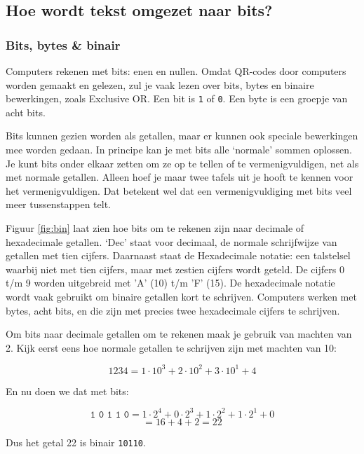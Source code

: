 \documentclass[a4paper]{article}
\begin{document}
\subsection{Hoe wordt tekst omgezet naar bits?}
\subsubsection{Bits, bytes \& binair}
Computers rekenen met bits: enen en nullen. Omdat QR-codes door computers worden gemaakt en gelezen, zul je vaak lezen over bits, bytes en binaire bewerkingen, zoals Exclusive OR. Een bit is \texttt{1} of \texttt{0}. Een byte is een groepje van acht bits.

Bits kunnen gezien worden als getallen, maar er kunnen ook speciale bewerkingen mee worden gedaan. In principe kan je met bits alle `normale' sommen oplossen. Je kunt bits onder elkaar zetten om ze op te tellen of te vermenigvuldigen, net als met normale getallen. Alleen hoef je maar twee tafels uit je hooft te kennen voor het vermenigvuldigen. Dat betekent wel dat een vermenigvuldiging met bits veel meer tussenstappen telt.

Figuur \ref{fig:bin} laat zien hoe bits om te rekenen zijn naar decimale of hexadecimale getallen. ‘Dec’ staat voor decimaal, de normale schrijfwijze van getallen met tien cijfers. Daarnaast staat de Hexadecimale notatie: een talstelsel waarbij niet met tien cijfers, maar met zestien cijfers wordt geteld. De cijfers 0 t/m 9 worden uitgebreid met 'A' (10) t/m 'F' (15). De hexadecimale notatie wordt vaak gebruikt om binaire getallen kort te schrijven. Computers werken met bytes, acht bits, en die zijn met precies twee hexadecimale cijfers te schrijven. 

Om bits naar decimale getallen om te rekenen maak je gebruik van machten van 2. Kijk eerst eens hoe normale getallen te schrijven zijn met machten van 10:

$$1234 = 1\cdot10^3 + 2\cdot10^2 + 3\cdot10^1 + 4$$

En nu doen we dat met bits:

$$\texttt{1 0 1 1 0} = 1\cdot2^4 + 0\cdot2^3 + 1\cdot2^2 + 1\cdot2^1 + 0$$
$$= 16 + 4 + 2 = 22$$

Dus het getal 22 is binair \texttt{10110}.
\end{document}

